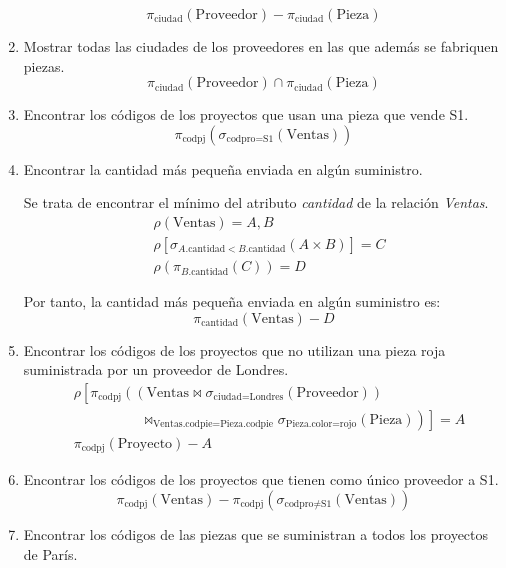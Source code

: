 \begin{ejercicio}
\begin{enumerate}
        \begin{equation*}
            \pi_{\text{ciudad}}(\text{Proveedor}) - \pi_{\text{ciudad}}(\text{Pieza})
        \end{equation*}
        \item Mostrar todas las ciudades de los proveedores en las que además se fabriquen piezas.
        \begin{equation*}
            \pi_{\text{ciudad}}(\text{Proveedor}) \cap \pi_{\text{ciudad}}(\text{Pieza})
        \end{equation*}
        \item Encontrar los códigos de los proyectos que usan una pieza que vende S1.
        \begin{equation*}
            \pi_{\text{codpj}}\left(\sigma_{\text{codpro} = \text{S1}}(\text{Ventas})\right)
        \end{equation*}
        \item Encontrar la cantidad más pequeña enviada en algún suministro.
        
        Se trata de encontrar el mínimo del atributo \emph{cantidad} de la relación \emph{Ventas}.
        \begin{align*}
            & \rho(\text{Ventas}) = A,B\\
            & \rho\left[\sigma_{A.\text{cantidad} < B.\text{cantidad}}(A \times B)\right] = C\\
            & \rho(\pi_{B.\text{cantidad}}(C)) = D
        \end{align*}

        Por tanto, la cantidad más pequeña enviada en algún suministro es:
        \begin{equation*}
            \pi_{\text{cantidad}}(\text{Ventas})-D
        \end{equation*}
        \item Encontrar los códigos de los proyectos que no utilizan una pieza roja suministrada por un proveedor de Londres.
        \begin{align*}
            &\rho\left[\pi_{\text{codpj}}\left(\left(\text{Ventas}\bowtie \sigma_{\text{ciudad}=\text{Londres}}(\text{Proveedor})\right)\right.\right.\\&\hspace{2cm}\left.\left.\bowtie_{\text{Ventas.codpie}=\text{Pieza.codpie}} \sigma_{\text{Pieza.color}=\text{rojo}}(\text{Pieza})\right)\right]=A\\
            & \pi_{\text{codpj}}(\text{Proyecto}) - A
        \end{align*}
        \item Encontrar los códigos de los proyectos que tienen como único proveedor a S1.
        \begin{equation*}
            \pi_{\text{codpj}}(\text{Ventas}) - \pi_{\text{codpj}}(\sigma_{\text{codpro}\neq \text{S1}}(\text{Ventas}))
        \end{equation*}
        \item Encontrar los códigos de las piezas que se suministran a todos los proyectos de París.
        

\end{enumerate}
\end{ejercicio}
